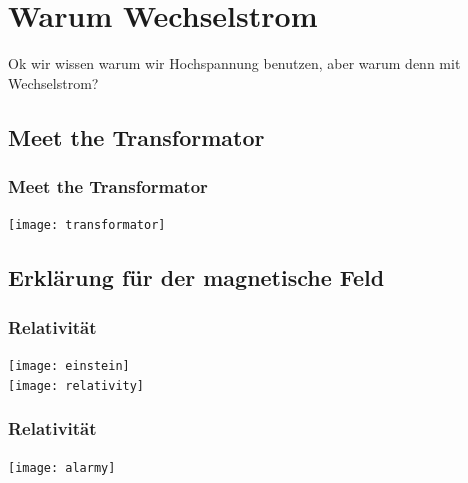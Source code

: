 \section{Warum Wechselstrom}

\begin{frameplain}
\Large
Ok wir wissen warum wir Hochspannung benutzen, aber warum denn mit Wechselstrom?
\end{frameplain}

\subsection{Meet the Transformator}
\begin{frame}
	\frametitle{Meet the Transformator}
	\texttt{[image: transformator]}
\end{frame}

\subsection{Erklärung für der magnetische Feld}
\begin{frame}
	\frametitle{Relativität}
	\texttt{[image: einstein]}\\
	\texttt{[image: relativity]}
\end{frame}

\begin{frame}
	\frametitle{Relativität}
	\centering
	\texttt{[image: alarmy]}
\end{frame}

